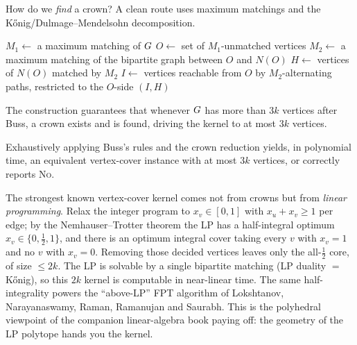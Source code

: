 How do we \emph{find} a crown? A clean route uses maximum matchings and the K\H{o}nig/Dulmage--Mendelsohn decomposition.

\begin{algorithm}[H]
\caption{\textsc{FindCrown}$(\Gph)$ --- crown via two matchings}
\label{ch25:alg-crown}
\DontPrintSemicolon
{}
$M_1 \gets$ a maximum matching of $G$\;
$O \gets$ set of $M_1$-unmatched vertices\;
$M_2 \gets$ a maximum matching of the bipartite graph between $O$ and $N(O)$\;
$H \gets$ vertices of $N(O)$ matched by $M_2$\;
$I \gets$ vertices reachable from $O$ by $M_2$-alternating paths, restricted to the $O$-side\;
\Return $(I,H)$\;
\end{algorithm}

The construction guarantees that whenever $G$ has more than $3k$ vertices after Buss, a crown exists and is found, driving the kernel to at most $3k$ vertices.

\begin{theorem}\label{ch25:thm-crown-kernel}
Exhaustively applying Buss's rules and the crown reduction yields, in polynomial time, an equivalent vertex-cover instance with at most $3k$ vertices, or correctly reports \textsc{No}.
\end{theorem}

\begin{connectionbox}
The strongest known vertex-cover kernel comes not from crowns but from \emph{linear programming}. Relax the integer program to $x_v\in[0,1]$ with $x_u+x_v\ge 1$ per edge; by the Nemhauser--Trotter theorem the LP has a half-integral optimum $x_v\in\{0,\tfrac12,1\}$, and there is an optimum integral cover taking every $v$ with $x_v=1$ and no $v$ with $x_v=0$. Removing those decided vertices leaves only the all-$\tfrac12$ core, of size $\le 2k$. The LP is solvable by a single bipartite matching (LP duality $=$ K\H{o}nig), so this $2k$ kernel is computable in near-linear time. The same half-integrality powers the ``above-LP'' FPT algorithm of Lokshtanov, Narayanaswamy, Raman, Ramanujan and Saurabh. This is the polyhedral viewpoint of the companion linear-algebra book paying off: the geometry of the LP polytope hands you the kernel.
\end{connectionbox}


